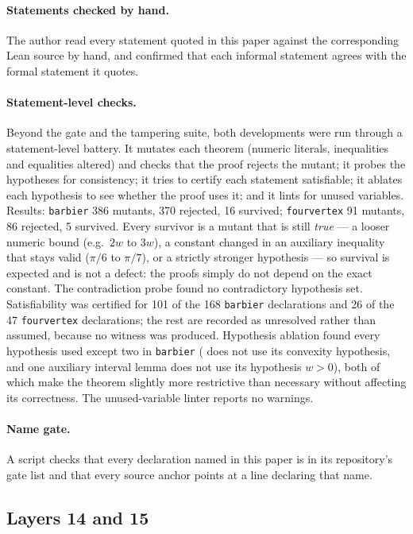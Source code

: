 \documentclass[11pt]{article}
\theoremstyle{definition}
\theoremstyle{remark}
\newcommand{\lean}[1]{\texttt{#1}}
\begin{document}
\paragraph{Statements checked by hand.} The author read every statement quoted in this paper against
the corresponding Lean source by hand, and confirmed that each informal statement agrees with the
formal statement it quotes.

\paragraph{Statement-level checks.} Beyond the gate and the tampering suite, both developments were
run through a statement-level battery. It mutates each theorem (numeric literals, inequalities and
equalities altered) and checks that the proof rejects the mutant; it probes the hypotheses for
consistency; it tries to certify each statement satisfiable; it ablates each hypothesis to see
whether the proof uses it; and it lints for unused variables. Results: \lean{barbier} 386 mutants,
370 rejected, 16 survived; \lean{fourvertex} 91 mutants, 86 rejected, 5 survived. Every survivor is a
mutant that is still \emph{true} --- a looser numeric bound (e.g.\ $2w$ to $3w$), a constant changed in
an auxiliary inequality that stays valid ($\pi/6$ to $\pi/7$), or a strictly stronger hypothesis ---
so survival is expected and is not a defect: the proofs simply do not depend on the exact constant.
The contradiction probe found no contradictory hypothesis set. Satisfiability was certified for 101
of the 168 \lean{barbier} declarations and 26 of the 47 \lean{fourvertex} declarations; the rest are
recorded as unresolved rather than assumed, because no witness was produced. Hypothesis ablation
found every hypothesis used except two in \lean{barbier} (
does not use its convexity hypothesis, and one auxiliary interval lemma does not use its hypothesis
$w>0$), both of which make the theorem slightly more restrictive than necessary without affecting its
correctness.
The unused-variable linter reports no warnings.

\paragraph{Name gate.} A script checks that every declaration named in this paper is in its
repository's gate list and that every source anchor points at a line declaring that name.

\subsection{Layers 14 and 15}\label{sec:l1415}
\end{document}
